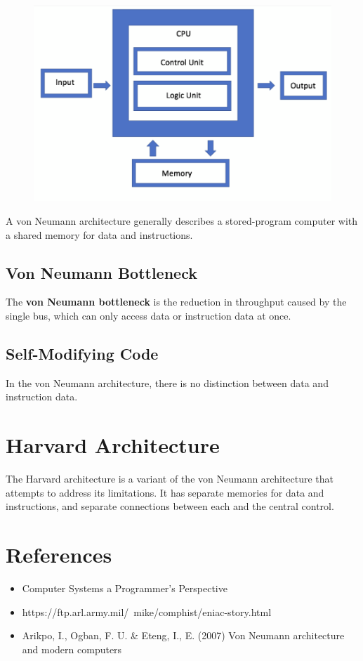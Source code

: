 \begin{figure}[h!]
	\includegraphics[scale=0.5]{./img/von-Neumann.png}
\end{figure}

A von Neumann architecture generally describes a stored-program computer with a shared memory for data and instructions.

\subsection{Von Neumann Bottleneck}

The \textbf{von Neumann bottleneck} is the reduction in throughput caused by the single bus, which can only access data or instruction data at once.

\subsection{Self-Modifying Code}

In the von Neumann architecture, there is no distinction between data and instruction data. 

\section{Harvard Architecture}

The Harvard architecture is a variant of the von Neumann architecture that attempts to address its limitations. It has separate memories for data and instructions, and separate connections between each and the central control.

\section{References}

\begin{itemize}
	\item Computer Systems a Programmer's Perspective
	\item https://ftp.arl.army.mil/~mike/comphist/eniac-story.html
	\item Arikpo, I., Ogban, F. U. \& Eteng, I., E. (2007) Von Neumann architecture and modern computers
\end{itemize}
